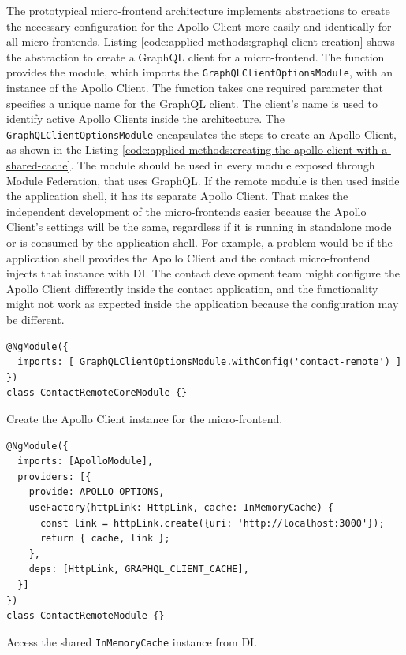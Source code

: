 \noindent The prototypical micro-frontend architecture implements abstractions to create the necessary configuration for the Apollo Client more easily and identically for all micro-frontends. Listing \ref{code:applied-methods:graphql-client-creation} shows the abstraction to create a GraphQL client for a micro-frontend. The function provides the module, which imports the \texttt{GraphQLClientOptionsModule}, with an instance of the Apollo Client. The function takes one required parameter that specifies a unique name for the GraphQL client. The client's name is used to identify active Apollo Clients inside the architecture. The \texttt{GraphQLClientOptionsModule} encapsulates the steps to create an Apollo Client, as shown in the Listing \ref{code:applied-methods:creating-the-apollo-client-with-a-shared-cache}. The module should be used in every module exposed through Module Federation, that uses GraphQL. If the remote module is then used inside the application shell, it has its separate Apollo Client. That makes the independent development of the micro-frontends easier because the Apollo Client's settings will be the same, regardless if it is running in standalone mode or is consumed by the application shell. For example, a problem would be if the application shell provides the Apollo Client and the contact micro-frontend injects that instance with \ac{DI}. The contact development team might configure the Apollo Client differently inside the contact application, and the functionality might not work as expected inside the application because the configuration may be different.

\ifshowListings
  \begin{listing}[H]
    \begin{verbatim}
@NgModule({
  imports: [ GraphQLClientOptionsModule.withConfig('contact-remote') ]
})
class ContactRemoteCoreModule {}
    \end{verbatim}
  \caption{Create the Apollo Client instance for the micro-frontend.}\label{code:applied-methods:graphql-client-creation}
  \end{listing}
\fi

\ifshowListings
\begin{listing}[H]
\begin{verbatim}
@NgModule({
  imports: [ApolloModule],
  providers: [{
    provide: APOLLO_OPTIONS,
    useFactory(httpLink: HttpLink, cache: InMemoryCache) {
      const link = httpLink.create({uri: 'http://localhost:3000'});
      return { cache, link };
    },
    deps: [HttpLink, GRAPHQL_CLIENT_CACHE],
  }]
})
class ContactRemoteModule {}
\end{verbatim}
\caption{Access the shared \texttt{InMemoryCache} instance from \ac{DI}.}\label{code:applied-methods:creating-the-apollo-client-with-a-shared-cache}
\end{listing}
\fi

